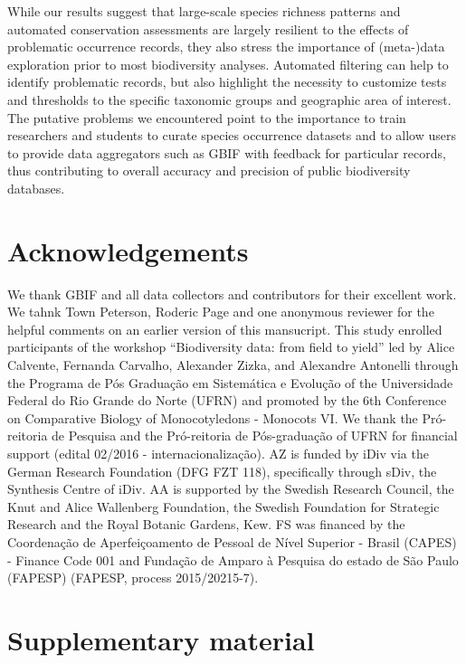 \documentclass[fleqn,10pt,lineno]{wlpeerj} %
\begin{document}
While our results suggest that large-scale species richness patterns and automated conservation assessments are largely resilient to the effects of problematic occurrence records, they also stress the importance of (meta-)data exploration prior to most biodiversity analyses. Automated filtering can help to identify problematic records, but also highlight the necessity to customize tests and thresholds to the specific taxonomic groups and geographic area of interest. The putative problems we encountered point to the importance to train researchers and students to curate species occurrence datasets and to allow users to provide data aggregators such as GBIF with feedback for particular records, thus contributing to overall accuracy and precision of public biodiversity databases.

\hypertarget{acknowledgements}{%
\section*{Acknowledgements}\label{acknowledgements}}

We thank GBIF and all data collectors and contributors for their excellent work. We tahnk Town Peterson, Roderic Page and one anonymous reviewer for the helpful comments on an earlier version of this mansucript. This study enrolled participants of the workshop ``Biodiversity data: from field to yield'' led by Alice Calvente, Fernanda Carvalho, Alexander Zizka, and Alexandre Antonelli through the Programa de Pós Graduação em Sistemática e Evolução of the Universidade Federal do Rio Grande do Norte (UFRN) and promoted by the 6th Conference on Comparative Biology of Monocotyledons - Monocots VI. We thank the Pró-reitoria de Pesquisa and the Pró-reitoria de Pós-graduação of UFRN for financial support (edital 02/2016 - internacionalização). AZ is funded by iDiv via the German Research Foundation (DFG FZT 118), specifically through sDiv, the Synthesis Centre of iDiv. AA is supported by the Swedish Research Council, the Knut and Alice Wallenberg Foundation, the Swedish Foundation for Strategic Research and the Royal Botanic Gardens, Kew. FS was financed by the Coordenação de Aperfeiçoamento de Pessoal de Nível Superior - Brasil (CAPES) - Finance Code 001 and Fundação de Amparo à Pesquisa do estado de São Paulo (FAPESP) (FAPESP, process 2015/20215-7).

\hypertarget{supplementary-material}{%
\section*{Supplementary material}\label{supplementary-material}}
\end{document}
